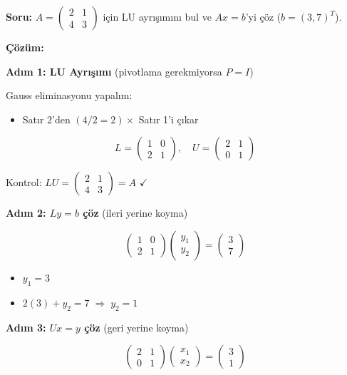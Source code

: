 \documentclass[12pt,a4paper]{article}
\theoremstyle{definition}
\theoremstyle{remark}
\begin{document}
\textbf{Soru:} $A = \begin{pmatrix} 2 & 1 \\ 4 & 3 \end{pmatrix}$ i\c{c}in LU ayr{\i}\c{s}{\i}m{\i}n{\i} bul ve $Ax = b$'yi \c{c}\"oz ($b = (3, 7)^T$).

\textbf{\c{C}\"oz\"um:}

\textbf{Ad{\i}m 1: LU Ayr{\i}\c{s}{\i}m{\i}} (pivotlama gerekmiyorsa $P = I$)

Gauss eliminasyonu yapal{\i}m:
\begin{itemize}
    \item Sat{\i}r 2'den $(4/2 = 2) \times$ Sat{\i}r 1'i \c{c}{\i}kar
\end{itemize}

\[
L = \begin{pmatrix} 1 & 0 \\ 2 & 1 \end{pmatrix}, \quad U = \begin{pmatrix} 2 & 1 \\ 0 & 1 \end{pmatrix}
\]

Kontrol: $LU = \begin{pmatrix} 2 & 1 \\ 4 & 3 \end{pmatrix} = A$ $\checkmark$

\textbf{Ad{\i}m 2: $Ly = b$ \c{c}\"oz} (ileri yerine koyma)

\[
\begin{pmatrix} 1 & 0 \\ 2 & 1 \end{pmatrix} \begin{pmatrix} y_1 \\ y_2 \end{pmatrix} = \begin{pmatrix} 3 \\ 7 \end{pmatrix}
\]

\begin{itemize}
    \item $y_1 = 3$
    \item $2(3) + y_2 = 7 \;\Rightarrow\; y_2 = 1$
\end{itemize}

\textbf{Ad{\i}m 3: $Ux = y$ \c{c}\"oz} (geri yerine koyma)

\[
\begin{pmatrix} 2 & 1 \\ 0 & 1 \end{pmatrix} \begin{pmatrix} x_1 \\ x_2 \end{pmatrix} = \begin{pmatrix} 3 \\ 1 \end{pmatrix}
\]
\end{document}
